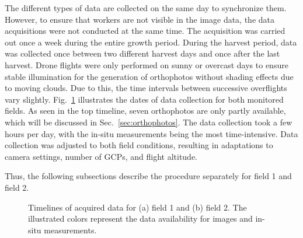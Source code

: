 \documentclass{article}
\def\secref#1{Sec.~\ref{#1}}
\def\figref#1{Fig.~\ref{#1}}
\begin{document}
The different types of data are collected on the same day to synchronize them. However, to ensure that workers are not visible in the image data, the data acquisitions were not conducted at the same time.
The acquisition was carried out once a week during the entire growth period. During the harvest period, data was collected once between two different harvest days and once after the last harvest. Drone flights were only performed on sunny or overcast days to ensure stable illumination for the generation of orthophotos without shading effects due to moving clouds.
Due to this, the time intervals between successive overflights vary slightly. \figref{fig:timeline} illustrates the dates of data collection for both monitored fields. 
As seen in the top timeline, seven orthophotos are only partly available, which will be discussed in \secref{sec:orthophotos}. The data collection took a few hours per day, with the in-situ measurements being the most time-intensive. Data collection was adjusted to both field conditions, resulting in adaptations to camera settings, number of GCPs, and flight altitude.

Thus, the following subsections describe the procedure separately for field 1 and field 2.

\begin{figure}[t]
	\centering
	
	\caption{Timelines of acquired data for (a) field 1 and (b) field 2. The illustrated colors represent the data availability for images and in-situ measurements.}
	\label{fig:timeline}
\end{figure}
\end{document}
